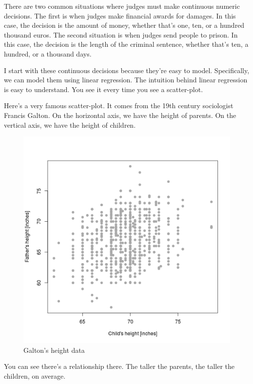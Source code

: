 \documentclass[12pt,twoside]{article}
\begin{document}
There are two common situations where judges must make continuous
numeric decisions. The first is when judges make financial awards for
damages. In this case, the decision is the amount of money, whether
that's one, ten, or a hundred thousand euros. The second situation is
when judges send people to prison. In this case, the decision is the
length of the criminal sentence, whether that's ten, a hundred, or a
thousand days.

I start with these continuous decisions because they're easy to model.
Specifically, we can model them using linear regression. The intuition
behind linear regression is easy to understand. You see it every time
you see a scatter-plot.

Here's a very famous scatter-plot. It comes from the 19th century
sociologist Francis Galton. On the horizontal axis, we have the height
of parents. On the vertical axis, we have the height of children.

\begin{figure}[htbp]
\centering
\includegraphics{figure/galton-1.png}
\caption{Galton's height data}
\end{figure}

You can see there's a relationship there. The taller the parents, the
taller the children, on average.
\end{document}
